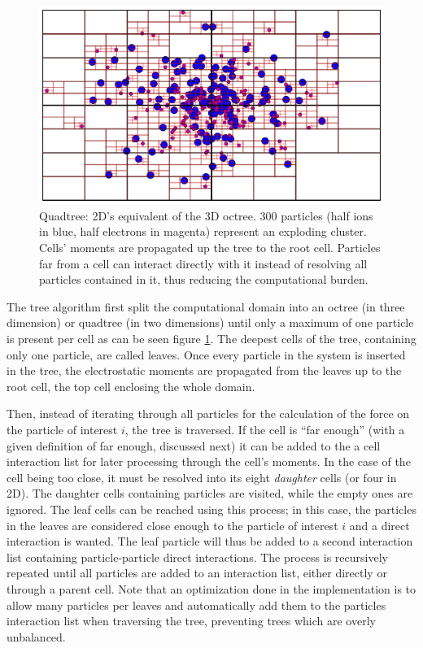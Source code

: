 \begin{figure}
 \centering
 \includegraphics[width=\figurewidth]{figures/quadtree}
 \caption{\label{fig:tree:quadtree}Quadtree: 2D's equivalent of the 3D octree.
          300 particles (half ions in blue, half electrons in magenta) represent
          an exploding cluster. Cells' moments are propagated up the tree to the
          root cell. Particles far from a cell can interact directly with it
          instead of resolving all particles contained in it, thus reducing the
          computational burden.}
\end{figure}


The tree algorithm first split the computational domain into an octree (in
three dimension) or quadtree (in two dimensions) until
only a maximum of one particle is present per cell as can be seen figure
\ref{fig:tree:quadtree}. The deepest cells of the tree, containing only one particle,
are called leaves. Once every particle in the system is inserted in the tree,
the electrostatic moments are propagated from the leaves up to the root cell,
the top cell enclosing the whole domain.

Then, instead of iterating through all particles for the calculation of the
force on the particle of interest $i$, the tree is traversed. If the cell is
``far enough'' (with a given definition of far enough, discussed next) it can
be added to the a cell interaction list for later processing through the cell's
moments. In the case of
the cell being too close, it must be resolved into its  eight \textit{daughter}
cells (or four in 2D). The daughter cells containing particles are visited, while the empty
ones are ignored. The leaf cells can be reached using this process; in this
case, the particles in the leaves are considered close enough to the particle
of interest $i$ and a direct interaction is wanted. The leaf particle will thus
be added to a second interaction list containing particle-particle direct
interactions. The process is recursively repeated until all particles
are added to an interaction list, either directly or through a parent cell.
Note that an optimization done in the
implementation is to allow many particles per leaves and automatically add them
to the particles interaction list when traversing the tree, preventing trees
which are overly unbalanced.

